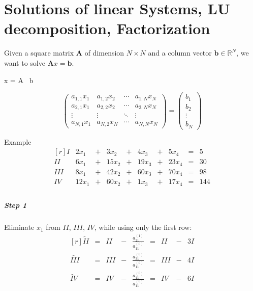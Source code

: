 \chapter{Solutions of linear Systems, LU decomposition, Factorization} %
\label{cha:solutions_of_linear_systems_lu_decomposition_factorisation}

Given a square matrix $\mathbf{A}$ of dimension $N \times N$ and a column vector 
$\mathbf{b} \in \mathbb{R}^N$, we want to solve $\mathbf{A}x = \mathbf{b}$.

\begin{Matlab}
	x = A \ b
\end{Matlab}

\[ 
	\begin{pmatrix}
		a_{1,1}x_1 & a_{1,2}x_2 & \cdots & a_{1,N}x_N \\
		a_{2,1}x_1 & a_{2,2}x_2 & \cdots & a_{2,N}x_N \\
		\vdots  & \vdots  & \ddots & \vdots  \\
		a_{N,1}x_1 & a_{N,2}x_N & \cdots & a_{N,N}x_N
	\end{pmatrix}
	=
	\begin{pmatrix}
		b_1 \\
		b_2 \\
		\vdots \\
		b_N
	\end{pmatrix}
 \]

Example
\[\begin{matrix*}[r]
		I   &  2x_1 & + &   3x_2 & + &   4x_3 & + &  5x_4 & = &   5 \\
		II  &  6x_1 & + &  15x_2 & + &  19x_3 & + & 23x_4 & = &  30 \\
		III &  8x_1 & + &  42x_2 & + &  60x_3 & + & 70x_4 & = &  98 \\
		IV  & 12x_1 & + &  60x_2 & + &   1x_3 & + & 17x_4 & = & 144 \\
\end{matrix*}\]


\paragraph{Step 1}

Eliminate $x_1$ from $II$, $III$, $IV$, while using only the first row:
\[\begin{matrix*}[r]
	\tilde{II}  & = & II  & - & \frac{a_{21}^{(1)}}{a_{11}^{(0)}} & = & II  & - & 3I \\
	\tilde{III} & = & III & - & \frac{a_{31}^{(0)}}{a_{11}^{(0)}} & = & III & - & 4I \\
	\tilde{IV}  & = & IV  & - & \frac{a_{41}^{(0)}}{a_{11}^{(0)}} & = & IV  & - & 6I \\
\end{matrix*}\]

